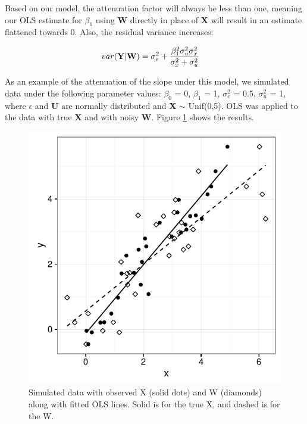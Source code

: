 \documentclass[11pt]{article}\usepackage[]{graphicx}\usepackage[]{color}
\makeatletter
\def\maxwidth{ %
  \ifdim\Gin@nat@width>\linewidth
    \linewidth
  \else
    \Gin@nat@width
  \fi
}
\newenvironment{knitrout}{}{} %
\makeatother
\begin{document}
Based on our model, the attenuation factor will always be less than one, meaning our OLS estimate for $\beta_1$ using {\bf W} directly in place of {\bf X} will result in an estimate flattened towards 0. Also, the residual variance increases:

\begin{align}
	var(\text{{\bf Y$|$W}}) &= \sigma_e^2 + \frac{\beta_1^2 \sigma_u^2 \sigma_x^2}{\sigma_x^2 + \sigma_u^2}
	\label{lmresidvar}
\end{align}

As an example of the attenuation of the slope under this model, we simulated data under the following parameter values: $\beta_0$ = 0, $\beta_1$ = 1, $\sigma_e^2$ = 0.5, $\sigma_u^2$ = 1, where $\epsilon$ and {\bf U} are normally distributed and {\bf X} $\sim$ Unif(0,5). OLS was applied to the data with true {\bf X} and with noisy {\bf W}. Figure \ref{fig:classical_lm_ex} shows the results.


\begin{knitrout}
\color{fgcolor}\begin{figure}
\includegraphics[width=\maxwidth]{figure/classical_lm_ex-1} \caption[Simulated data with observed X (solid dots) and W (diamonds) along with fitted OLS lines]{Simulated data with observed X (solid dots) and W (diamonds) along with fitted OLS lines. Solid is for the true X, and dashed is for the W.}\label{fig:classical_lm_ex}
\end{figure}


\end{knitrout}
\end{document}
